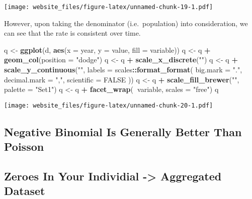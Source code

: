 \documentclass[]{book}
\newenvironment{Shaded}{\begin{snugshade}}{\end{snugshade}}
\newcommand{\KeywordTok}[1]{\textcolor[rgb]{0.13,0.29,0.53}{\textbf{#1}}}
\newcommand{\DataTypeTok}[1]{\textcolor[rgb]{0.13,0.29,0.53}{#1}}
\newcommand{\StringTok}[1]{\textcolor[rgb]{0.31,0.60,0.02}{#1}}
\newcommand{\OtherTok}[1]{\textcolor[rgb]{0.56,0.35,0.01}{#1}}
\newcommand{\OperatorTok}[1]{\textcolor[rgb]{0.81,0.36,0.00}{\textbf{#1}}}
\newcommand{\NormalTok}[1]{#1}
\begin{document}
\texttt{[image: website\_files/figure-latex/unnamed-chunk-19-1.pdf]}

However, upon taking the denominator (i.e.~population) into
consideration, we can see that the rate is consistent over time.

\begin{Shaded}
\begin{Highlighting}[]
\NormalTok{q <-}\StringTok{ }\KeywordTok{ggplot}\NormalTok{(d, }\KeywordTok{aes}\NormalTok{(}\DataTypeTok{x =}\NormalTok{ year, }\DataTypeTok{y =}\NormalTok{ value, }\DataTypeTok{fill =}\NormalTok{ variable))}
\NormalTok{q <-}\StringTok{ }\NormalTok{q }\OperatorTok{+}\StringTok{ }\KeywordTok{geom_col}\NormalTok{(}\DataTypeTok{position =} \StringTok{"dodge"}\NormalTok{)}
\NormalTok{q <-}\StringTok{ }\NormalTok{q }\OperatorTok{+}\StringTok{ }\KeywordTok{scale_x_discrete}\NormalTok{(}\StringTok{""}\NormalTok{)}
\NormalTok{q <-}\StringTok{ }\NormalTok{q }\OperatorTok{+}\StringTok{ }\KeywordTok{scale_y_continuous}\NormalTok{(}\StringTok{""}\NormalTok{, }\DataTypeTok{labels =}\NormalTok{ scales}\OperatorTok{::}\KeywordTok{format_format}\NormalTok{(}
  \DataTypeTok{big.mark =} \StringTok{"."}\NormalTok{, }
  \DataTypeTok{decimal.mark =} \StringTok{","}\NormalTok{, }
  \DataTypeTok{scientific =} \OtherTok{FALSE}
\NormalTok{  ))}
\NormalTok{q <-}\StringTok{ }\NormalTok{q }\OperatorTok{+}\StringTok{ }\KeywordTok{scale_fill_brewer}\NormalTok{(}\StringTok{""}\NormalTok{, }\DataTypeTok{palette =} \StringTok{"Set1"}\NormalTok{)}
\NormalTok{q <-}\StringTok{ }\NormalTok{q }\OperatorTok{+}\StringTok{ }\KeywordTok{facet_wrap}\NormalTok{(}\OperatorTok{~}\NormalTok{variable, }\DataTypeTok{scales =} \StringTok{"free"}\NormalTok{)}
\NormalTok{q}
\end{Highlighting}
\end{Shaded}

\texttt{[image: website\_files/figure-latex/unnamed-chunk-20-1.pdf]}

\subsection{Negative Binomial Is Generally Better Than
Poisson}\label{negative-binomial-is-generally-better-than-poisson}

\subsection{Zeroes In Your Individial -\textgreater{} Aggregated
Dataset}\label{zeroes-in-your-individial---aggregated-dataset}
\end{document}
